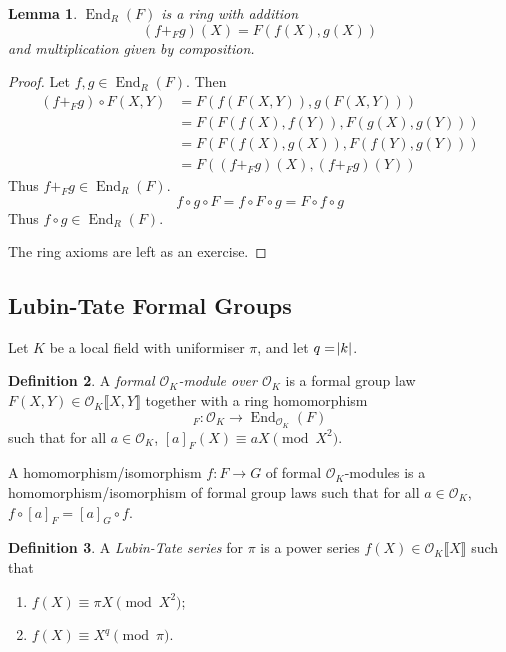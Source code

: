 \documentclass[11pt]{article}
\theoremstyle{definition}
\newtheorem{definition}{Definition}[subsection]
\theoremstyle{plain}
\newtheorem{lemma}[definition]{Lemma}
\theoremstyle{remark}
\DeclareMathOperator{\End}{End}
\newcommand{\cO}{\mathcal{O}}
\begin{document}
\begin{lemma}\label{lem:18_5}
    $\End_R(F)$ is a ring with addition
    \begin{equation*}
        (f +_F g)(X) = F(f(X), g(X))
    \end{equation*}
    and multiplication given by composition.
\end{lemma}
\begin{proof}
    Let $f, g \in \End_R(F)$. Then
    \begin{align*}
        (f +_F g) \circ F(X, Y)
        &= F(f(F(X, Y)), g(F(X, Y)))\\
        &= F(F(f(X), f(Y)), F(g(X), g(Y)))\\
        &= F(F(f(X), g(X)), F(f(Y), g(Y)))\\
        &= F((f +_F g)(X), (f +_F g)(Y))
    \end{align*}
    Thus $f +_F g \in \End_R(F)$.
    \begin{equation*}
        f \circ g \circ F = f \circ F \circ g = F \circ f \circ g
    \end{equation*}
    Thus $f \circ g \in \End_R(F)$.

    The ring axioms are left as an exercise.
\end{proof}

\subsection{Lubin-Tate Formal Groups}

Let $K$ be a local field with uniformiser $\pi$, and let $q = \abs{k}$.

\begin{definition}\label{def:19_1}
    A \emph{formal $\cO_K$-module over $\cO_K$} is a formal group law $F(X, Y) \in \cO_K\llbracket X, Y \rrbracket$ together with a ring homomorphism
    \begin{equation*}
        [\cdot]_F : \cO_K \to \End_{\cO_K}(F)
    \end{equation*}
    such that for all $a \in \cO_K$, $[a]_F(X) \equiv a X \pmod{X^2}$.

    A homomorphism/isomorphism $f : F \to G$ of formal $\cO_K$-modules is a homomorphism/isomorphism of formal group laws such that for all $a \in \cO_K$, $f \circ [a]_F = [a]_G \circ f$.
\end{definition}

\begin{definition}\label{def:19_2}
    A \emph{Lubin-Tate series} for $\pi$ is a power series $f(X) \in \cO_K \llbracket X \rrbracket$ such that
    \begin{enumerate}
        \item $f(X) \equiv \pi X \pmod{X^2}$;
        \item $f(X) \equiv X^q \pmod{\pi}$.
    \end{enumerate}
\end{definition}
\end{document}
